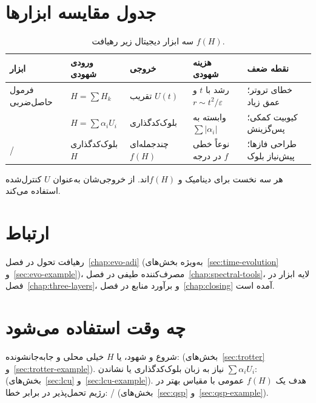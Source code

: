 \section{جدول مقایسه ابزارها}

\begin{table}[htbp]
	\centering
	\footnotesize
	\setlength{\tabcolsep}{2pt}
	\caption{سه ابزار دیجیتال زیر رهیافت $f(H)$.}
	\label{tab:digital-tools}
	\begin{tabularx}{\textwidth}{@{}
		>{\raggedright\arraybackslash}p{2.6cm}
		>{\raggedright\arraybackslash}p{2.4cm}
		>{\raggedright\arraybackslash}X
		>{\raggedright\arraybackslash}X
		>{\raggedright\arraybackslash}p{3.8cm}
		@{}}
		\toprule
		\rowcolor{gray!14}
		\textbf{ابزار} & \textbf{ورودی شهودی} & \textbf{خروجی} & \textbf{هزینه شهودی} & \textbf{نقطه ضعف} \\
		\midrule
		فرمول حاصل‌ضربی
		& $H=\sum H_k$
		& تقریب $U(t)$
		& رشد با $t$ و $r\sim t^{2}/\varepsilon$
		& خطای تروتر؛ عمق زیاد
		\\
		\rowcolor{gray!8}
		\lr{LCU}
		& $H=\sum \alpha_i U_i$
		& بلوک‌کدگذاری
		& وابسته به $\sum\lvert\alpha_i\rvert$
		& کیوبیت کمکی؛ پس‌گزینش
		\\
		\lr{QSP}/\lr{QSVT}
		& بلوک‌کدگذاری $H$
		& چندجمله‌ای $f(H)$
		& نوعاً خطی در درجه $f$
		& طراحی فازها؛ پیش‌نیاز بلوک
		\\
		\bottomrule
	\end{tabularx}
\end{table}

هر سه نخست برای دینامیک و $f(H)$اند.  از خروجی‌شان به‌عنوان $U$ کنترل‌شده استفاده می‌کند.

\section{ارتباط}

رهیافت تحول در فصل~\ref{chap:evo-adi} (به‌ویژه بخش‌های~\ref{sec:time-evolution} و~\ref{sec:evo-example})، مصرف‌کننده طیفی در فصل~\ref{chap:spectral-tools}، لایه ابزار در فصل~\ref{chap:three-layers}، و برآورد منابع در فصل~\ref{chap:closing} آمده است.

\section{چه وقت استفاده می‌شود}

شروع و شهود، یا $H$ خیلی محلی و جابه‌جانشونده:  (بخش‌های~\ref{sec:trotter} و~\ref{sec:trotter-example}). نیاز به زبان بلوک‌کدگذاری یا نشاندن $\sum\alpha_i U_i$:  (بخش‌های~\ref{sec:lcu} و~\ref{sec:lcu-example}). هدف یک $f(H)$ عمومی با مقیاس بهتر در رژیم تحمل‌پذیر در برابر خطا: / (بخش‌های~\ref{sec:qsp} و~\ref{sec:qsp-example}).


